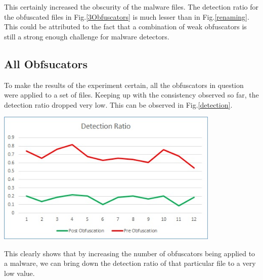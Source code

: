 This certainly increased the obscurity of the malware files. The detection ratio for the obfuscated files in Fig.\ref{3Obfuscators} is much lesser than in Fig.\ref{renaming}. This could be attributed to the fact that a combination of weak obfuscators is still a strong enough challenge for malware detectors.

\subsection{All Obfsucators}	 

To make the results of the experiment certain, all the obfuscators in question were applied to a set of files. Keeping up with the consistency observed so far, the detection ratio dropped very low. This can be observed in Fig.\ref{detection}.
	 
 	 \vspace{3mm}
 	 \begin{center}
 	 	\includegraphics[width=0.8\textwidth]{detectionRatio.jpg}
 	 	\label{detection}
 	 \end{center}
 	 \vspace{3mm}

This clearly shows that by increasing the number of obfuscators being applied to a malware, we can bring down the detection ratio of that particular file to a very low value. 	 